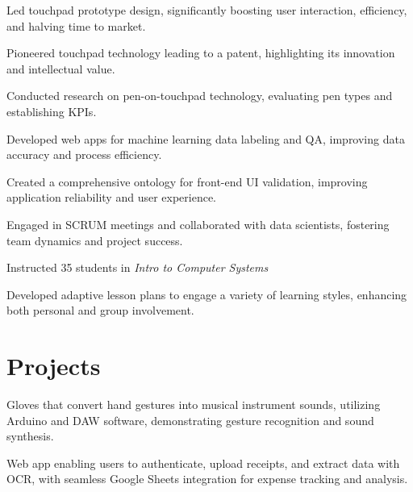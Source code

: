 \documentclass[]{resume-openfont}
\begin{document}
\begin{minipage}[t]{1\textwidth}
\begin{tightemize}
    \item Led touchpad prototype design, significantly boosting user interaction, efficiency, and halving time to market.
    \item Pioneered touchpad technology leading to a patent, highlighting its innovation and intellectual value.
    \item Conducted research on pen-on-touchpad technology, evaluating pen types and establishing KPIs.
\end{tightemize}
\sectionsep

\begin{tightemize}
    \item Developed web apps for machine learning data labeling and QA, improving data accuracy and process efficiency.
    \item Created a comprehensive ontology for front-end UI validation, improving application reliability and user experience.
    \item Engaged in SCRUM meetings and collaborated with data scientists, fostering team dynamics and project success.
\end{tightemize}
\sectionsep

\begin{tightemize}
    \item Instructed 35 students in {\it Intro to Computer Systems}
    \item Developed adaptive lesson plans to engage a variety of learning styles, enhancing both personal and group involvement.    
\end{tightemize}
\sectionsep

\end{minipage}


\begin{minipage}[t]{1\textwidth}
\vspace{-4 mm}
\section{Projects}
\titlerule
\vspace{2.5 mm}

Gloves that convert hand gestures into musical instrument sounds, utilizing Arduino and DAW software, demonstrating gesture recognition and sound synthesis.
\sectionsep

Web app enabling users to authenticate, upload receipts, and extract data with OCR, with seamless Google Sheets integration for expense tracking and analysis.
\sectionsep

\end{minipage} 
\end{document}

